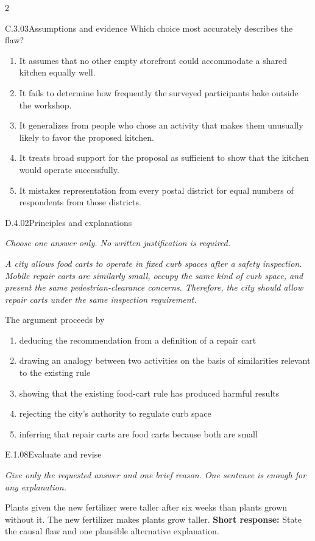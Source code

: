 \documentclass[9pt]{extarticle}
\newcommand{\choice}[1]{\item #1}
\begin{document}
\begin{multicols}{2}
\begin{DenseCoreProblem}{C.3.03}{Assumptions and evidence}
Which choice most accurately describes the flaw?
\begin{enumerate}[label=(\alph*)]
  \choice{It assumes that no other empty storefront could accommodate a shared kitchen equally well.}
  \choice{It fails to determine how frequently the surveyed participants bake outside the workshop.}
  \choice{It generalizes from people who chose an activity that makes them unusually likely to favor the proposed kitchen.}
  \choice{It treats broad support for the proposal as sufficient to show that the kitchen would operate successfully.}
  \choice{It mistakes representation from every postal district for equal numbers of respondents from those districts.}
\end{enumerate}
\end{DenseCoreProblem}
\begin{DenseCoreProblem}{D.4.02}{Principles and explanations}
{\scriptsize\textit{Choose one answer only. No written justification is required.}\par}
\emph{A city allows food carts to operate in fixed curb spaces after a safety inspection. Mobile repair carts are similarly small, occupy the same kind of curb space, and present the same pedestrian-clearance concerns. Therefore, the city should allow repair carts under the same inspection requirement.}

The argument proceeds by
\begin{enumerate}[label=(\alph*)]
  \choice{deducing the recommendation from a definition of a repair cart}
  \choice{drawing an analogy between two activities on the basis of similarities relevant to the existing rule}
  \choice{showing that the existing food-cart rule has produced harmful results}
  \choice{rejecting the city's authority to regulate curb space}
  \choice{inferring that repair carts are food carts because both are small}
\end{enumerate}
\end{DenseCoreProblem}
\begin{DenseCoreProblem}{E.1.08}{Evaluate and revise}
{\scriptsize\textit{Give only the requested answer and one brief reason. One sentence is enough for any explanation.}\par}
Plants given the new fertilizer were taller after six weeks than plants grown without it. The new fertilizer makes plants grow taller.
\textbf{Short response:} State the causal flaw and one plausible alternative explanation.
\end{DenseCoreProblem}
\end{multicols}
\end{document}
